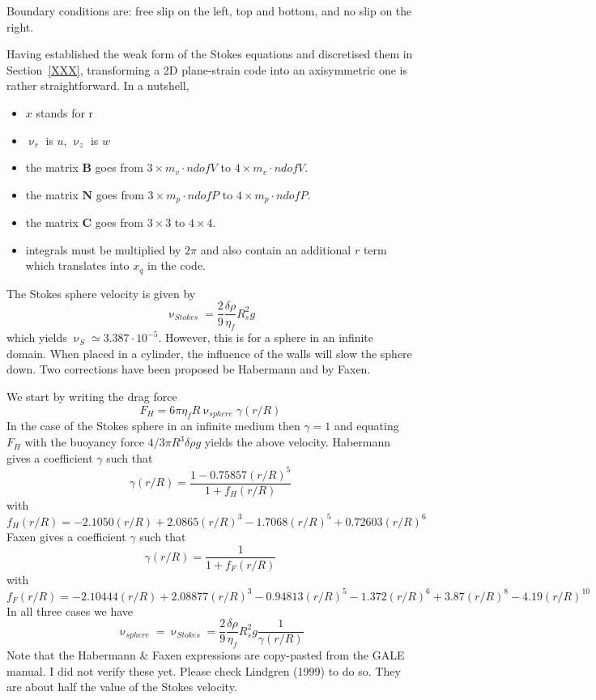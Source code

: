 Boundary conditions are: free slip on the left, top and bottom, and no slip on the right.

Having established the weak form of the Stokes equations and discretised them in 
Section~\ref{XXX}, transforming a 2D plane-strain code into an axisymmetric one is rather straightforward.
In a nutshell, 
\begin{itemize}
\item $x$ stands for r
\item $\upnu_r$ is $u$, $\upnu_z$ is $w$
\item the matrix ${\bm B}$ goes from 
$3 \times m_v\cdot ndofV$ to
$4 \times m_v\cdot ndofV$. 
\item the matrix ${\bm N}$ goes from 
$3 \times m_p\cdot ndofP$ to
$4 \times m_p\cdot ndofP$. 
\item the matrix ${\bm C}$ goes from 
$3 \times 3$ to $4 \times 4$.
\item integrals must be multiplied by $2 \pi$ and also contain an additional $r$ term
which translates into $x_q$ in the code. 
\end{itemize}


The Stokes sphere velocity is given by
\[
\upnu_{Stokes} = \frac{2}{9} \frac{\delta \rho}{\eta_f} R_s^2 g
\]
which yields $\upnu_S\simeq 3.387 \cdot 10^{-5}$. However, 
this is for a sphere in an infinite domain. When placed in a 
cylinder, the influence of the walls will slow the sphere down. 
Two corrections have been proposed be Habermann and by Faxen.

We start by writing the drag force
\[
F_H = 6 \pi \eta_f R \upnu_{sphere}  \gamma(r/R) 
\]
In the case of the Stokes sphere in an infinite medium then $\gamma =1$ and equating
$F_H$ with the buoyancy force $4/3 \pi R^3 \delta\rho g$ yields the above velocity.
Habermann gives a coefficient $\gamma$ such that 
\[
\gamma(r/R)  = \frac{1-0.75857 (r/R)^5}{1+f_H(r/R)}
\]
with 
\[
f_H(r/R) = -2.1050(r/R)+ 2.0865(r/R)^3-  1.7068(r/R)^5 + 0.72603(r/R)^6 
\]
Faxen gives a coefficient $\gamma$ such that 
\[
\gamma(r/R) = \frac{1}{1 + f_F(r/R)} 
\]
with 
\[
f_F(r/R) = -2.10444(r/R) + 2.08877(r/R)^3 - 0.94813(r/R)^5 -1.372(r/R)^6 + 3.87(r/R)^8 - 4.19(r/R)^{10}
\]
In all three cases we have 
\[
\upnu_{sphere} = \upnu_{Stokes} = \frac{2}{9} \frac{\delta \rho}{\eta_f} R_s^2 g \frac{1}{\gamma(r/R)}
\]
Note that the Habermann \& Faxen expressions are copy-pasted from the GALE manual. I did not verify these yet. 
Please check Lindgren (1999) \cite{lind99} to do so. They are about half the value of the Stokes velocity.

